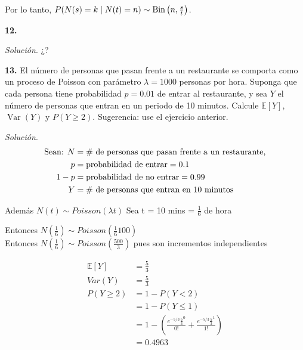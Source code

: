 \documentclass[12pt]{article}
\newcommand{\E}{\mathbb{E}}
\DeclareMathOperator{\Var}{Var}
\begin{document}
Por lo tanto, $ P(N(s) = k \mid N(t) = n) \sim \textnormal{Bin} \left(n, \frac{s}{t} \right)$.

\begin{tcolorbox}[colback=blue!5!white, colframe=blue!5!white, arc=0mm, boxrule=0pt]
    \textbf{12.} 
\end{tcolorbox} 

\textit{Solución}. ¿?

\begin{tcolorbox}[colback=blue!5!white, colframe=blue!5!white, arc=0mm, boxrule=0pt]
    \textbf{13.} El número de personas que pasan frente a un restaurante se comporta  como un proceso de Poisson con parámetro $\lambda = 1000$ personas por hora. Suponga que cada persona tiene probabilidad $p = 0.01$ de entrar al restaurante, y sea $Y$ el número de personas que entran en un periodo de 10 minutos. Calcule $\E[Y]$, $\Var(Y)$ y $P(Y \geq 2)$. Sugerencia: use el ejercicio anterior.

\end{tcolorbox} 

\textit{Solución}.
\begin{align*}
 \textnormal{Sean: } N &= \textnormal{\# de personas que pasan frente a un restaurante,}\\
 p &= \textnormal{probabilidad de entrar} = 0.1\\
 1-p &= \textnormal{probabilidad de no entrar} = 0.99\\
 Y &= \# \textnormal{ de personas que entran en 10 minutos}
\end{align*}

Además $N(t) \sim Poisson(\lambda t)$
Sea t = 10 mins = $\frac{1}{6}$ de hora

Entonces $N\left(\frac{1}{6}\right) \sim Poisson \left(\frac{1}{6}100\right)$
\\Entonces $N\left(\frac{1}{6}\right) \sim Poisson \left(\frac{500}{3}\right)$ pues son incrementos independientes

\begin{align*}
    \E[Y] &= \frac{5}{3}\\
    Var(Y) &= \frac{5}{3}\\
    P(Y \geq 2) &= 1 - P(Y < 2) \\
    &= 1 - P(Y \leq 1) \\
    &= 1 - \left( \frac{e^{-5/3} \frac{5}{3}^{0} }{0!} + \frac{e^{-5/3} \frac{5}{3}^{1} }{1!}\right)\\
    &= 0.4963
\end{align*}
\end{document}
